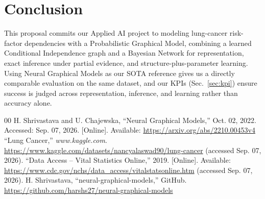 \documentclass[conference]{IEEEtran}
\begin{document}
	
	\section{Conclusion}
	This proposal commits our Applied AI project to modeling lung-cancer risk-factor dependencies with a Probabilistic Graphical Model, combining a learned Conditional Independence graph and a Bayesian Network for representation, exact inference under partial evidence, and structure-plus-parameter learning. Using Neural Graphical Models \cite{ngm2022} as our SOTA reference gives us a directly comparable evaluation on the same dataset, and our KPIs (Sec.~\ref{sec:kpi}) ensure success is judged across representation, inference, and learning rather than accuracy alone.
	
	\begin{thebibliography}{00}
		 H. Shrivastava and U. Chajewska, ``Neural Graphical Models,'' Oct. 02, 2022. Accessed: Sep. 07, 2026. [Online]. Available: \url{https://arxiv.org/abs/2210.00453v4}
		 ``Lung Cancer,'' \emph{www.kaggle.com}. \url{https://www.kaggle.com/datasets/nancyalaswad90/lung-cancer} (accessed Sep. 07, 2026).
		 ``Data Access -- Vital Statistics Online,'' 2019. [Online]. Available: \url{https://www.cdc.gov/nchs/data_access/vitalstatsonline.htm} (accessed Sep. 07, 2026).
		 H. Shrivastava, ``neural-graphical-models,'' GitHub. \url{https://github.com/harshs27/neural-graphical-models}
	\end{thebibliography}
	
\end{document}
